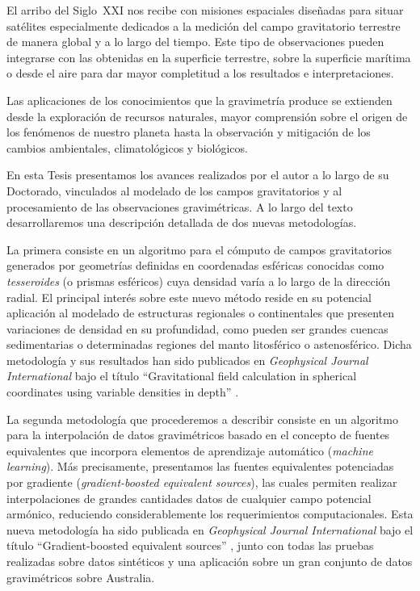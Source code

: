 El arribo del Siglo~XXI nos recibe con misiones espaciales
diseñadas para situar satélites especialmente dedicados a la medición del campo
gravitatorio terrestre de manera global y a lo largo del tiempo.
Este tipo de observaciones pueden integrarse con las obtenidas en la superficie
terrestre, sobre la superficie marítima o desde el aire para dar mayor
completitud a los resultados e interpretaciones.

Las aplicaciones de los conocimientos que la gravimetría produce se extienden
desde la exploración de recursos naturales, mayor comprensión sobre el origen
de los fenómenos de nuestro planeta hasta la observación y mitigación de los
cambios ambientales, climatológicos y biológicos.

En esta Tesis presentamos los avances realizados por el autor a lo largo de su
Doctorado, vinculados al modelado de los campos gravitatorios y al
procesamiento de las observaciones gravimétricas.
A lo largo del texto desarrollaremos una descripción detallada de dos nuevas
metodologías.

La primera consiste en un algoritmo para el cómputo de campos gravitatorios
generados por geometrías definidas en coordenadas esféricas conocidas como
\emph{tesseroides} (o prismas esféricos) cuya densidad varía a lo largo de la
dirección radial.
El principal interés sobre este nuevo método reside en su potencial aplicación
al modelado de estructuras regionales o continentales que presenten variaciones
de densidad en su profundidad, como pueden ser grandes cuencas sedimentarias
o determinadas regiones del manto litosférico o astenosférico.
Dicha metodología y sus resultados han sido publicados en \emph{Geophysical
Journal International} bajo el título ``Gravitational field calculation in
spherical coordinates using variable densities in depth'' \citep{soler2019}.

La segunda metodología que procederemos a describir consiste en un algoritmo
para la interpolación de datos gravimétricos basado en el concepto de fuentes
equivalentes que incorpora elementos de aprendizaje automático (\emph{machine
learning}).
Más precisamente, presentamos las fuentes equivalentes potenciadas por
gradiente (\emph{gradient-boosted equivalent sources}), las cuales permiten
realizar interpolaciones de grandes cantidades datos de cualquier campo
potencial armónico, reduciendo considerablemente los requerimientos
computacionales.
Esta nueva metodología
ha sido publicada en \emph{Geophysical Journal International} bajo
el título ``Gradient-boosted equivalent sources'' \citep{soler2021}, junto con
todas las pruebas realizadas sobre datos sintéticos y una aplicación sobre un
gran conjunto de datos gravimétricos sobre Australia.


